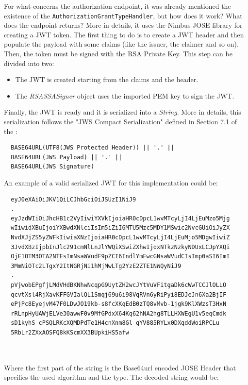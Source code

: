 For what concerns the authorization endpoint, it was already mentioned the existence of the \texttt{AuthorizationGrantTypeHandler}, but how does it work? What does the endpoint returns? More in details, it uses the Nimbus JOSE library for creating a JWT token. The first thing to do is to create a JWT header and then populate the payload with some claims (like the issuer, the claimer and so on). Then, the token must be signed with the RSA Private Key. This step can be divided into two: 

\begin{itemize}
    \item The JWT is created starting from the claims and the header.
    \item The \textit{RSASSASigner} object uses the imported PEM key to sign the JWT.
\end{itemize}

\noindent Finally, the JWT is ready and it is serialized into a \textit{String}. More in details, this serialization follows the "JWS Compact Serialization" defined in Section 7.1 of the  \cite{RFC7515}:

\begin{lstlisting}
  BASE64URL(UTF8(JWS Protected Header)) || '.' ||
  BASE64URL(JWS Payload) || '.' ||
  BASE64URL(JWS Signature)
\end{lstlisting}

\noindent An example of a valid serialized JWT for this implementation could be:

\begin{lstlisting}
  eyJ0eXAiOiJKV1QiLCJhbGciOiJSUzI1NiJ9
  .
  eyJzdWIiOiJhcHB1c2VyIiwiYXVkIjoiaHR0cDpcL1wvMTcyLjI4LjEuMzo5Mjg
  wIiwidXBuIjoiYXBwdXNlciIsIm5iZiI6MTU5Mzc5MDY1MSwic2NvcGUiOiJyZX
  NvdXJjZS5yZWFkIiwiaXNzIjoiaHR0cDpcL1wvMTcyLjI4LjEuMjo5MDgwIiwiZ
  3JvdXBzIjpbInJlc291cmNlLnJlYWQiXSwiZXhwIjoxNTkzNzkyNDUxLCJpYXQi
  OjE1OTM3OTA2NTEsImNsaWVudF9pZCI6IndlYmFwcGNsaWVudCIsImp0aSI6ImI
  3MmNiOTc2LTgxY2ItNGRjNi1hMjMwLTg2YzE2ZTE1NWQyNiJ9
  .
  pVjwobEPgfjLMdVHdBKNhwNcqpG9UytZH2wcJYtVuVFitgaDk6cWwTCCJlOLLO
  qcvtXsl4RjXavKFFGVIalQL1Smqj69u6i98VqRVn6yRiPyi8EDJeJn6Xa2BjIF
  ePjPc8EyejvM47F0LDwJO19kb-s8fcXKqEdB0zTQ8vMvb-1jgk9KlXWzsT3HxN
  rRLnpHyUAWjELVe30awwF0v9MfGPdxX64Kq62hNA2hg8TLLHXWEgU1v5eqCmdk
  sD1kyhS_cPSQLRKcXQMDPdTe1H4cnXnm8Gl_qYV885RYLx0DXqddWoiRPCLu
  5RbLr2ZXxAOSFQ8kKScmXX3BUpkiHS5afw

  
\end{lstlisting}

\noindent Where the first part of the string is the Base64url encoded JOSE Header that specifies the used algorithm and the type. The decoded string would be:

